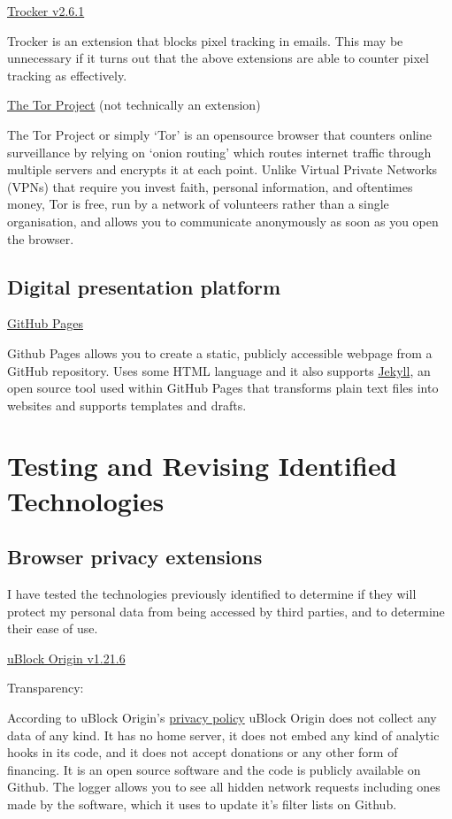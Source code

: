 \documentclass{article}
\begin{document}
\noindent\href{https://trockerapp.github.io/}{Trocker v2.6.1}

Trocker is an extension that blocks pixel tracking in emails. This may be unnecessary if it turns out that the above extensions are able to counter pixel tracking as effectively. \newline

\noindent\href{https://www.torproject.org/}{The Tor Project} (not technically an extension)

The Tor Project or simply ‘Tor’ is an opensource browser that counters online surveillance by relying on ‘onion routing’ which routes internet traffic through multiple servers and encrypts it at each point. Unlike Virtual Private Networks (VPNs) that require you invest faith, personal information, and oftentimes money, Tor is free, run by a network of volunteers rather than a single organisation, and allows you to communicate anonymously as soon as you open the browser.    

\subsection{Digital presentation platform}
\href{https://pages.github.com/}{GitHub Pages}

Github Pages allows you to create a static, publicly accessible webpage from a GitHub repository. Uses some HTML language and it also supports \href{https://github.com/jekyll/jekyll}{Jekyll}, an open source tool used within GitHub Pages that transforms plain text files into websites and supports templates and drafts. 

\section{Testing and Revising Identified Technologies}
\subsection{Browser privacy extensions}
I have tested the technologies previously identified to determine if they will protect my personal data from being accessed by third parties, and to determine their ease of use.\newline
 
\noindent\href{https://github.com/gorhill/uBlock}{uBlock Origin v1.21.6}

\noindent Transparency:

According to uBlock Origin's \href{https://github.com/gorhill/uBlock/wiki/Privacy-policy}{privacy policy} uBlock Origin does not collect any data of any kind. It has no home server, it does not embed any kind of analytic hooks in its code, and it does not accept donations or any other form of financing. It is an open source software and the code is publicly available on Github. The logger allows you to see all hidden network requests including ones made by the software, which it uses to update it's filter lists on Github. \newline
\end{document}
